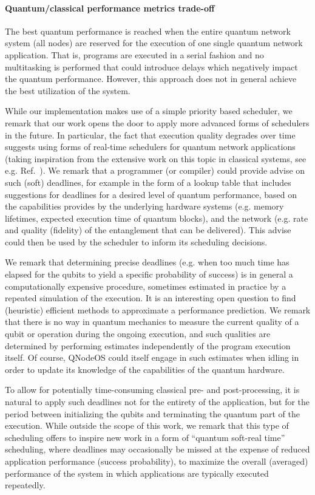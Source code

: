 \paragraph{Quantum/classical performance metrics trade-off}

The best quantum performance is reached when the entire quantum network system (all nodes) are reserved for the execution of one single quantum network application. That is, programs are executed in a serial fashion and no multitasking is performed that could introduce delays which negatively impact the quantum performance. However, this approach does not in general achieve the best utilization of the system. 

While our implementation makes use of a simple priority based scheduler, we remark that our work opens the door to apply more advanced forms of schedulers in the future. In particular, the fact that execution quality degrades over time suggests using forms of real-time schedulers for quantum network applications (taking inspiration from the extensive work on this topic in classical systems, see e.g. Ref.~\cite{liu_1973_scheduling}).  We remark that a programmer (or compiler) could provide advise on such (soft) deadlines, for example in the form of a lookup table that includes suggestions for deadlines for a desired level of quantum performance, based on the capabilities provides by the underlying hardware systems (e.g. memory lifetimes, expected execution time of quantum blocks), and the network (e.g. rate and quality (fidelity) of the entanglement that can be delivered). This advise could then be used by the scheduler to inform its scheduling decisions.

We remark that determining precise deadlines (e.g. when too much time has elapsed for the qubits to yield a specific probability of success) is in general a computationally expensive procedure, sometimes estimated in practice by a repeated simulation of the execution. It is an interesting open question to find (heuristic) efficient methods to approximate a performance prediction. We remark that there is no way in quantum mechanics to measure the current quality of a qubit or operation during the ongoing execution, and such qualities are determined by performing estimates independently of the program execution itself. Of course, \ac{QNodeOS} could itself engage in such estimates when idling in order to update its knowledge of the capabilities of the quantum hardware.

To allow for potentially time-consuming classical pre- and post-processing, it is natural to apply such deadlines not for the entirety of the application, but for the period between initializing the qubits and terminating the quantum part of the execution. While outside the scope of this work, we remark that this type of scheduling offers to inspire new work in a form of ``quantum soft-real time'' scheduling, where deadlines may occasionally be missed at the expense of reduced application performance (success probability), to maximize the overall (averaged) performance of the system in which
applications are typically executed repeatedly. 

